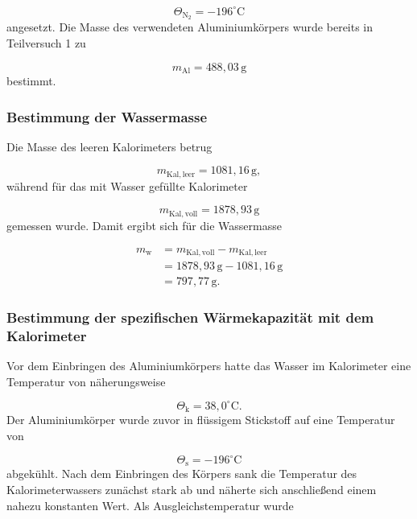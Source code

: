 \documentclass{report}
\begin{document}
\begin{equation}
\Theta_\mathrm{N_2}=-196^\circ\mathrm{C}
\end{equation}
\noindent
angesetzt.
\noindent
Die Masse des verwendeten Aluminiumkörpers wurde bereits in Teilversuch 1 zu

\begin{equation}
m_\mathrm{Al}=488{,}03\,\mathrm{g}
\end{equation}
\noindent
bestimmt.


\subsubsection{Bestimmung der Wassermasse}
\noindent
Die Masse des leeren Kalorimeters betrug

\begin{equation}
m_\mathrm{Kal,leer}=1081{,}16\,\mathrm{g},
\end{equation}
\noindent
während für das mit Wasser gefüllte Kalorimeter

\begin{equation}
m_\mathrm{Kal,voll}=1878{,}93\,\mathrm{g}
\end{equation}
\noindent
gemessen wurde.
\noindent
Damit ergibt sich für die Wassermasse

\begin{align}
m_\mathrm{w}
&=
m_\mathrm{Kal,voll}-m_\mathrm{Kal,leer}\\
&=
1878{,}93\,\mathrm{g}
-
1081{,}16\,\mathrm{g}\\
&=
797{,}77\,\mathrm{g}.
\end{align}


\subsubsection{Bestimmung der spezifischen Wärmekapazität mit dem Kalorimeter}
\noindent
Vor dem Einbringen des Aluminiumkörpers hatte das Wasser im Kalorimeter eine
Temperatur von näherungsweise

\begin{equation}
\Theta_\mathrm{k}=38{,}0^\circ\mathrm{C}.
\end{equation}
\noindent
Der Aluminiumkörper wurde zuvor in flüssigem Stickstoff auf eine Temperatur von

\begin{equation}
\Theta_\mathrm{s}=-196^\circ\mathrm{C}
\end{equation}
\noindent
abgekühlt.
\noindent
Nach dem Einbringen des Körpers sank die Temperatur des Kalorimeterwassers zunächst
stark ab und näherte sich anschließend einem nahezu konstanten Wert. Als
Ausgleichstemperatur wurde
\end{document}
